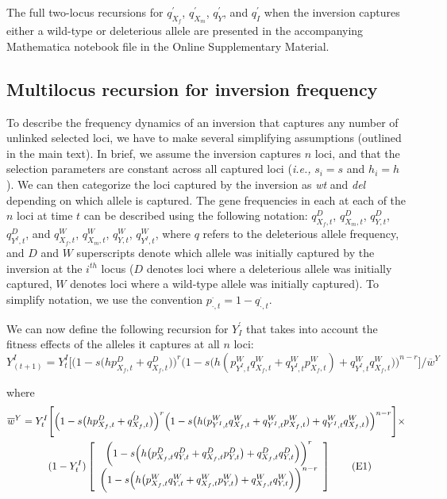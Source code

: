 \documentclass{article}
\newcommand\numberthis{\addtocounter{equation}{1}\tag{\theequation}}
\begin{document}
\begin{appendices}
The full two-locus recursions for $q^{\prime}_{X_f}$, $q^{\prime}_{X_m}$, $q^{\prime}_Y$, and $q^{\prime}_I$ when the inversion captures either a wild-type or deleterious allele are presented in the accompanying Mathematica notebook file in the Online Supplementary Material. 


\subsection{Multilocus recursion for inversion frequency} \label{subsec:multilocYI}

To describe the frequency dynamics of an inversion that captures any number of unlinked selected loci, we have to make several simplifying assumptions (outlined in the main text). In brief, we assume the inversion captures $n$ loci, and that the selection parameters are constant across all captured loci ({\itshape i.e.,} $s_i = s$ and $h_i = h$). We can then categorize the loci captured by the inversion as {\itshape wt} and {\itshape del} depending on which allele is captured. The gene frequencies in each at each of the $n$ loci at time $t$ can be described using the following notation: $q^{D}_{X_f,t}$, $q^{D}_{X_m,t}$, $q^{D}_{Y,t}$, $q^{D}_{Y^I,t}$, and $q^{W}_{X_f,t}$, $q^{W}_{X_m,t}$, $q^{W}_{Y,t}$, $q^{W}_{Y^I,t}$, where $q$ refers to the deleterious allele frequency, and $D$ and $W$ superscripts denote which allele was initially captured by the inversion at the $i^{th}$ locus ($D$ denotes loci where a deleterious allele was initially captured, $W$ denotes loci where a wild-type allele was initially captured). To simplify notation, we use the convention $p^{\cdot}_{\cdot,t} = 1 - q^{\cdot}_{\cdot,t}$. 

We can now define the following recursion for $Y^{\prime}_I$ that takes into account the fitness effects of the alleles it captures at all $n$ loci:
\begin{equation} \label{eq:YIprime-multiLoc}
	Y^I_{(t + 1)} = Y^I_t \Bigg[ \Big(1 - s \big(h p^{D}_{X_f,t} + q^{D}_{X_f,t} \big) \Big)^{r}\Big(1 - s \big(h (p^{W}_{Y^I,t} q^{W}_{X_f,t} + q^{W}_{Y^I,t} p^{W}_{X_f,t}) + q^{W}_{Y^I,t} q^{W}_{X_f,t} \big) \Big)^{n-r} \Bigg] \Bigg/ \overline{w}^Y
\end{equation}

\noindent where 
\begin{align*}\label{eq:wBarY-multiLoc}
	\overline{w}^Y = Y^I_t &\Bigg[ \Big(1 - s \big(h p^{D}_{X_f,t} + q^{D}_{X_f,t} \big) \Big)^{r}\Big(1 - s \big(h (p^{W}_{Y^I,t} q^{W}_{X_f,t} + q^{W}_{Y^I,t} p^{W}_{X_f,t}) + q^{W}_{Y^I,t} q^{W}_{X_f,t} \big) \Big)^{n-r} \Bigg] \times \\
	&(1 - Y^I_t) \left[\begin{array}{c}
											\bigg( 1 - s \Big( h \big( p^{D}_{X_f,t} q^{D}_{Y,t} +  q^{D}_{X_f,t} p^{D}_{Y,t} \big) + q^{D}_{X_f,t} q^{D}_{Y,t} \Big) \bigg)^r\\
											\bigg( 1 - s \Big( h \big( p^{W}_{X_f,t} q^{W}_{Y,t} +  q^{W}_{X_f,t} p^{W}_{Y,t} \big) + q^{W}_{X_f,t} q^{W}_{Y,t} \Big) \bigg)^{n-r}
											\end{array} \right] \numberthis
\end{align*}


\end{appendices}
\end{document}
